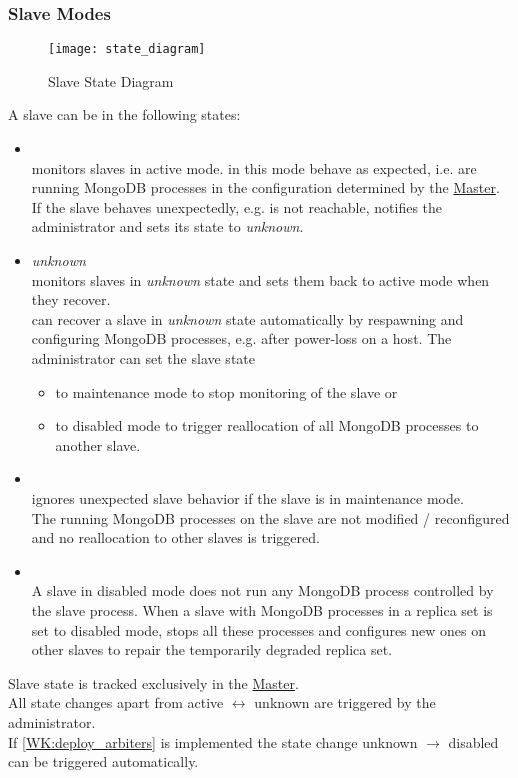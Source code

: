 \documentclass[a4paper, 11pt]{article}
\begin{document}
\subsubsection{Slave Modes}\label{SM:SlaveModes}
\begin{figure}[H]
\centering
\texttt{[image: state\_diagram]}
\caption{Slave State Diagram}
\end{figure}
A slave can be in the following states:
\begin{itemize}
	\item {}\\
	\mamid monitors \glspl{slave} in active mode.  in this mode behave as expected, i.e. are running MongoDB processes in the configuration determined by the \hyperref[SM:Master]{Master}.\\
	If the slave behaves unexpectedly, e.g. is not reachable, \mamid notifies the \gls{administrator} and sets its state to \emph{unknown}.
	\item \emph{unknown}\\
	\mamid monitors \glspl{slave} in \emph{unknown} state and sets them back to \gls{active mode} when they recover.\\
	\mamid can recover a slave in \emph{unknown} state automatically by respawning and configuring MongoDB processes, e.g. after power-loss on a  \gls{host}.
	The \gls{administrator} can set the slave state
	\begin{itemize}
		\item to \gls{maintenance mode} to stop monitoring of the slave or
		\item to \gls{disabled mode} to trigger reallocation of all \gls{MongoDB} processes to another slave.
	\end{itemize}
	\item {}\\
	\mamid ignores unexpected slave behavior if the slave is in maintenance mode.\\The running MongoDB processes on the slave are not modified / reconfigured and no reallocation to other slaves is triggered.
	\item {}\\
	A \gls{slave} in disabled mode does not run any \gls{MongoDB} process controlled by the slave process. When a \gls{slave} with MongoDB processes in a \gls{replica set} is set to disabled mode, \mamid stops all these processes and configures new ones on other \glspl{slave} to repair the temporarily degraded replica set.
\end{itemize}
Slave state is tracked exclusively in the \hyperref[SM:Master]{Master}.\\
All state changes apart from active $\leftrightarrow$ unknown are triggered by the \gls{administrator}.\\
If \ref{WK:deploy_arbiters} is implemented the state change unknown $\rightarrow$ disabled can be triggered automatically.
\end{document}
